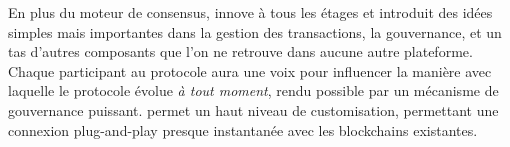 \documentclass[runningheads]{llncs}
\begin{document}
En plus du moteur de consensus, \AVAPlatformName{} innove à tous les étages et introduit des idées simples mais
importantes dans la gestion des transactions, la gouvernance, et un tas d'autres composants que l'on ne retrouve dans
aucune autre plateforme. Chaque participant au protocole aura une voix pour influencer la manière avec laquelle le
protocole évolue \emph{à tout moment}, rendu possible par un mécanisme de gouvernance puissant. \AVAPlatformName{}
permet un haut niveau de customisation, permettant une connexion plug-and-play presque instantanée avec les blockchains
existantes.



\end{document}
